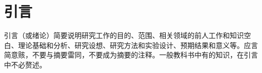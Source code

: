 \setlength{\baselineskip}{20pt}

\chapter{引言}
\label{cha:intro}

引言（或绪论）简要说明研究工作的目的、范围、相关领域的前人工作和知识空白、理论基础和分析、研究设想、研究方法和实验设计、预期结果和意义等。应言简意赅，不要与摘要雷同，不要成为摘要的注释。一般教科书中有的知识，在引言中不必赘述。